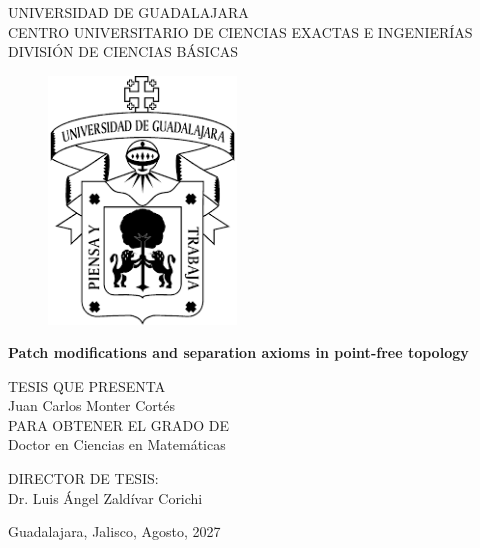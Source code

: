 \documentclass[letterpaper,12pt,oneside]{book}
\begin{document}
\begin{titlepage}
	
	\vspace*{2cm} 
		\begin{center}
			UNIVERSIDAD DE GUADALAJARA\\
			CENTRO UNIVERSITARIO DE CIENCIAS EXACTAS E INGENIERÍAS\\
			DIVISIÓN DE CIENCIAS BÁSICAS
		\end{center}
		\begin{figure}[htp]
			\centering
			\includegraphics*[width=5cm]{LogoUdg1.png}
		\end{figure}
		\begin{center}
			\textbf{Patch modifications and separation axioms in point-free topology}
		\end{center}
		\begin{center}
			TESIS QUE PRESENTA\\
			Juan Carlos Monter Cortés\\
			PARA OBTENER EL GRADO DE \\
			Doctor en Ciencias en Matemáticas
		\end{center}
		\vspace*{0.5cm}
		\begin{center}
			DIRECTOR DE TESIS:\\
			Dr. Luis Ángel Zaldívar Corichi\\
		\end{center}
		\begin{flushright}
			\vfill
		Guadalajara, Jalisco, Agosto, 2027\par
		\end{flushright}
\end{titlepage}

\newpage
$\ $
\thispagestyle{empty} %

\newpage
$\ $
\thispagestyle{empty} %
\end{document}

